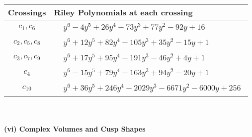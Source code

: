 \documentclass[1p]{elsarticle_modified}
\theoremstyle{definition}
\begin{document}
\begin{tabular}{m{50pt}|m{274pt}}
Crossings & \hspace{64pt}Riley Polynomials at each crossing \\
\hline $$\begin{aligned}c_{1},c_{6}\end{aligned}$$&$\begin{aligned}
&y^6-4 y^5+26 y^4-73 y^3+77 y^2-92 y+16
\end{aligned}$\\
\hline $$\begin{aligned}c_{2},c_{5},c_{8}\end{aligned}$$&$\begin{aligned}
&y^6+12 y^5+82 y^4+105 y^3+35 y^2-15 y+1
\end{aligned}$\\
\hline $$\begin{aligned}c_{3},c_{7},c_{9}\end{aligned}$$&$\begin{aligned}
&y^6+17 y^5+95 y^4-191 y^3-46 y^2+4 y+1
\end{aligned}$\\
\hline $$\begin{aligned}c_{4}\end{aligned}$$&$\begin{aligned}
&y^6-15 y^5+79 y^4-163 y^3+94 y^2-20 y+1
\end{aligned}$\\
\hline $$\begin{aligned}c_{10}\end{aligned}$$&$\begin{aligned}
&y^6+36 y^5+246 y^4-2029 y^3-6671 y^2-6000 y+256
\end{aligned}$\\
\hline
\end{tabular}\\~\\
\newpage\flushleft \textbf{(vi) Complex Volumes and Cusp Shapes}
\end{document}
